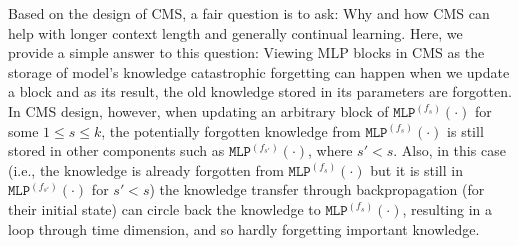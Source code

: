 \documentclass{article}
\newcommand{\head}[1]{\vspace{1.7mm}\noindent{{\textcolor{c4}{\bf #1.}}}}
\begin{document}
{\head{CMS Design Helps with Continual Learning} 
Based on the design of CMS, a fair question is to ask: Why and how CMS can help with longer context length and generally continual learning. Here, we provide a simple answer to this question: Viewing MLP blocks in CMS as the storage of model's knowledge catastrophic forgetting can happen when we update a block and as its result, the old knowledge stored in its parameters are forgotten. In CMS design, however, when updating an arbitrary block of $\texttt{MLP}^{(f_s)}(\cdot)$ for some $1 \leq s \leq k$, the potentially forgotten knowledge from $\texttt{MLP}^{(f_s)}(\cdot)$ is still stored in other components such as $\texttt{MLP}^{(f_{s'})}(\cdot)$, where $s' < s$. Also, in this case (i.e., the knowledge is already forgotten from $\texttt{MLP}^{(f_s)}(\cdot)$ but it is still in $\texttt{MLP}^{(f_{s'})}(\cdot)$ for $s' < s$) the knowledge transfer through backpropagation (for their initial state) can circle back the knowledge to $\texttt{MLP}^{(f_s)}(\cdot)$, resulting in a loop through time dimension, and so hardly forgetting important knowledge.   

}
\end{document}

